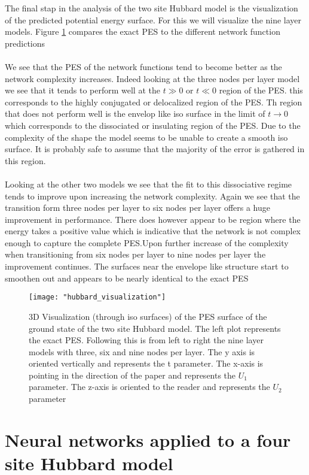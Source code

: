 \documentclass[12pt]{article}
\begin{document}
The final stap in the analysis of the two site Hubbard model is the visualization of the predicted potential energy surface. For this we will visualize the nine layer models. Figure \ref{fig:PES} compares the exact PES to the different network function predictions 
\\
\\
We see that the PES of the network functions tend to become better as the network complexity increases. Indeed looking at the three nodes per layer model we see that it tends to perform well at the $t\gg0$ or $t\ll0$ region of the PES. this corresponds to the highly conjugated or delocalized region of the PES. Th region that does not perform well is the envelop like iso surface in the limit of $t\rightarrow0$ which corresponds to the dissociated or insulating region of the PES. Due to the complexity of the shape the model seems to be unable to create a smooth iso surface. It is probably safe to assume that the majority of the error is gathered in this region.
\\
\\
Looking at the other two models we see that the fit to this dissociative regime tends to improve upon increasing the network complexity. Again we see that the transition form three nodes per layer to six nodes per layer offers a huge improvement in performance. There does however appear to be region where the energy takes a positive value which is indicative that the network is not complex enough to capture the complete PES.Upon further increase of the complexity when transitioning from six nodes per layer to nine nodes per layer the improvement continues. The surfaces near the envelope like structure start to smoothen out and appears to be nearly identical to the exact PES
\begin{figure}[H]
	\texttt{[image: "hubbard\_visualization"]}
	\caption{ 3D Visualization (through iso surfaces) of the PES surface of the ground state of the two site Hubbard model. The left plot represents the exact PES. Following this is from left to right the nine layer models with three, six and nine nodes per layer. The y axis is oriented vertically and represents the t parameter. The x-axis is pointing in the direction of the paper and represents the $U_1$ parameter. The z-axis is oriented to the reader and represents the $U_2$ parameter}
	\label{fig:PES}
\end{figure}

\newpage
\section{Neural networks applied to a four site Hubbard model}
\end{document}
